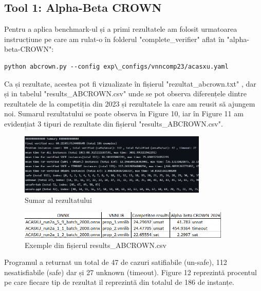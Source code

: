 \documentclass[12pt,a4paper]{article}
\theoremstyle{definition}
\theoremstyle{remark}
\begin{document}
\subsection{Tool 1: Alpha-Beta CROWN}
Pentru a aplica benchmark-ul și a primi rezultatele am folosit urmatoarea instrucțiune pe care am rulat-o în folderul "complete\_verifier" aflat în "alpha-beta-CROWN": 
\begin{lstlisting}[style=bashstyle]
    python abcrown.py --config exp\_configs/vnncomp23/acasxu.yaml
\end{lstlisting}
Ca și rezultate, acestea pot fi vizualizate în fișierul  "rezultat\_abcrown.txt" \cite{ref1}, dar și in tabelul "results\_ABCROWN.csv"\cite{ref2} unde se pot observa diferențele dintre rezultatele de la competiția din 2023 și rezultatele la care am reusit să ajungem noi. Sumarul rezultatului se poate observa în Figure 10, iar în Figure 11 am evidențiat 3 tipuri de rezultate din fișierul "results\_ABCROWN.csv".\par
\begin{figure}[h!]
  \centering
    \includegraphics[width=0.8\textwidth]{rezultat.png}
    \caption{Sumar al rezultatului}
\end{figure}
\begin{figure}[h!]
  \centering
    \includegraphics[width=0.9\textwidth]{csv.png}
    \caption{Exemple din fișierul results\_ABCROWN.csv}
\end{figure}

Programul a returnat un total de 47 de cazuri satifiabile (un-safe), 112 nesatisfiabile (safe) dar și 27 unknown (timeout). Figure 12 reprezintă procentul pe care fiecare tip de rezultat il reprezintă din totalul de 186 de instanțe. \par
\end{document}
